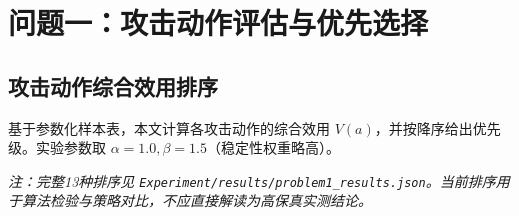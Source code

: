\section{问题一：攻击动作评估与优先选择}
\subsection{攻击动作综合效用排序}
基于参数化样本表，本文计算各攻击动作的综合效用 $V(a)$，并按降序给出优先级。实验参数取 $\alpha=1.0, \beta=1.5$（稳定性权重略高）。

\immediate{}

\textit{注：完整13种排序见 \texttt{Experiment/results/problem1\_results.json}。当前排序用于算法检验与策略对比，不应直接解读为高保真实测结论。}
